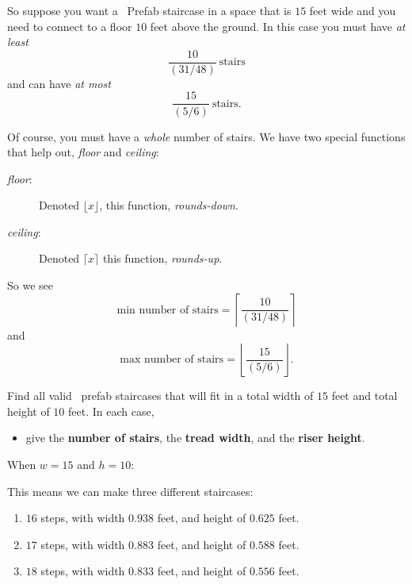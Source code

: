 \documentclass[noauthor,nooutcomes,handout]{ximera}
\begin{document}
So suppose you want a \mooculus~Prefab staircase in a space that is
$15$ feet wide and you need to connect to a floor $10$ feet above the
ground. In this case you must have \emph{at least}
\[
\frac{10}{\left(31/48\right)} \ \text{stairs}
\]
and can have \emph{at most}
\[
\frac{15}{\left(5/6\right)} \ \text{stairs}.
\]


Of course, you must have a \emph{whole} number of stairs. We have two special functions that help out, \emph{floor} and \emph{ceiling}:
\begin{description}
\item[\emph{floor}:] Denoted $\lfloor x\rfloor$, this function, \emph{rounds-down}.
\item[\emph{ceiling}:] Denoted $\lceil x\rceil$ this function, \emph{rounds-up}.
\end{description}
So we see
\[
\text{min number of stairs} = \left\lceil \frac{10}{\left(31/48\right)} \right\rceil
\]
and
\[
\text{max number of stairs} = \left\lfloor \frac{15}{\left(5/6\right)} \right\rfloor.
\]


\mynewpage


\begin{question}
  Find all valid \mooculus~prefab staircases that will fit in a total
  width of $15$ feet and total height of $10$ feet. In each case,
  \begin{itemize}
  \item give the \textbf{number of stairs}, the \textbf{tread width},
    and the \textbf{riser height}.
  \end{itemize}
  \begin{freeResponse}
  When $w=15$ and $h=10$:
  
  This means we can make three different staircases:
  \begin{enumerate}
  \item $16$ steps, with width $0.938$ feet, and height of $0.625$ feet.
  \item $17$ steps, with width $0.883$ feet, and height of $0.588$ feet.
  \item $18$ steps, with width $0.833$ feet, and height of $0.556$ feet.
  \end{enumerate}
  \end{freeResponse}
\end{question}


\mynewpage
\end{document}
